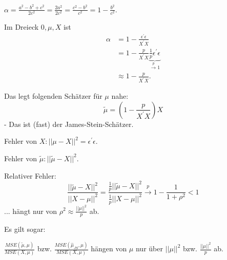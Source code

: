 \documentclass{tstextbook}
\begin{document}
	$ \alpha = \frac{a^2-b^2+c^2}{2c^2} = \frac{2a^2}{2c^2} = \frac{c^2-b^2}{c^2} = 1 - \frac{b^2}{c^2} $. 
	
	Im Dreieck $ 0,\mu,X $ ist 
	\[
	\begin{aligned}
		\alpha & = 1- \frac{\epsilon^\prime\epsilon}{X^\prime X} \\
		& = 1 - \frac{p}{X^\prime X}\underbrace{\frac{1}{p}\epsilon^\prime\epsilon}_{\xrightarrow{p} 1} \\
		& \approx 1- \frac{p}{X^\prime X}.
	\end{aligned}
	\]
	
	Das legt folgenden Schätzer für $ \mu $ nahe:
	\[
	\tilde{\mu} = \left(1-\frac{p}{X^\prime X}\right)X
	\]
	- Das ist (fast) der James-Stein-Schätzer. 
	
	Fehler von $ X\colon ||\mu-X||^2 = \epsilon^\prime \epsilon $. 
	
	Fehler von $ \tilde{\mu}  \colon ||\tilde{\mu} -X||^2 $. 
	
	Relativer Fehler: 
	\[
	\frac{||\tilde{\mu}-X||^2}{||X-\mu||^2} = \frac{\frac{1}{p}||\tilde{\mu}-X||^2}{\frac{1}{p}||X-\mu||^2} \xrightarrow{p} 1-\frac{1}{1+\rho^2} < 1
	\]
	... hängt nur von $ \rho^2  \approx \frac{||\mu||^2}{p} $ ab.
	
	Es gilt sogar:
	
	$ \frac{MSE(\tilde{\mu},\mu)}{MSE(X,\mu)} $ bzw. 	$ \frac{MSE(\hat{\mu}_{JS},\mu)}{MSE(X,\mu)} $ hängen von $ \mu $ nur über $ ||\mu||^2 $ bzw. $ \frac{||\mu||^2}{p} $ ab.


\printindex
\end{document}
